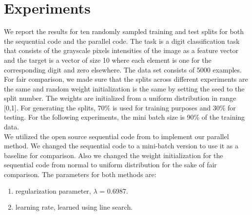 \documentclass{sig-alternate-05-2015}
\begin{document}





\section{Experiments} \label{E}
We report the results for ten randomly sampled training and test splits for both the sequential code and the parallel code. The task is a digit classification task that consists of the grayscale pixels intensities of the image as a feature vector and the target is a vector of size 10 where each element is one for the corresponding digit and zero elsewhere. The data set consists of 5000 examples. For fair comparison, we made sure that the splits across different experiments are the same and random weight initialization is the same by setting the seed to the split number. The weights are initialized from a uniform distribution in range [0,1]. For generating the splits, 70\% is used for training purposes and 30\% for testing. For the following experiments, the mini batch size is 90\% of the training data.\\
We utilized the open source sequential code from \cite{dvincentNN} to implement our parallel method. We changed the sequential code to a mini-batch version to use it as a baseline for comparison. Also we changed the weight initialization for the sequential code from normal to uniform distribution for the sake of fair comparison. The parameters for both methods are:
\begin{enumerate}
\item regularization parameter, $\lambda$ = 0.6987.
\item learning rate, learned using line search.
\end{enumerate}
\end{document}
